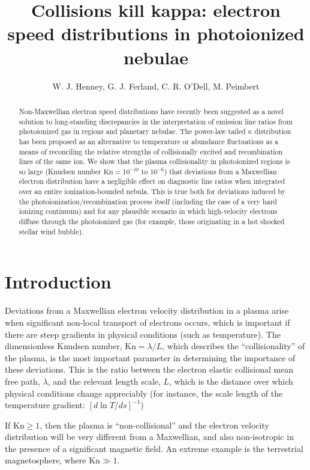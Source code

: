 \documentclass{emulateapj}
\newcommand\Kn{\ensuremath{\mathrm{Kn}}}
\newcommand\hii{\ion{H}{2}}
\begin{document}
\title{Collisions kill kappa: electron speed distributions in
  photoionized nebulae}

\author{W. J. Henney, G. J. Ferland, C. R. O'Dell, M. Peimbert}

\begin{abstract}
  Non-Maxwellian electron speed distributions have recently been
  suggested as a novel solution to long-standing discrepancies in the
  interpretation of emission line ratios from photoionized gas in
  \hii{} regions and planetary nebulae.  The power-law tailed
  \(\kappa\)
  distribution has been proposed as an alternative to temperature or
  abundance fluctuations as a means of reconciling the relative
  strengths of collisionally excited and recombination lines of the
  same ion.  We show that the plasma collisionality in photoionized
  regions is so large (Knudsen number \(\Kn = 10^{-10}\)
  to \( 10^{-6}\))
  that deviations from a Maxwellian electron distribution have a
  negligible effect on diagnostic line ratios when integrated over an
  entire ionization-bounded nebula.  This is true both for deviations
  induced by the photoionization/recombination process itself
  (including the case of a very hard ionizing continuum) and for any
  plausible scenario in which high-velocity electrons diffuse through
  the photoionized gas (for example, those originating in a hot
  shocked stellar wind bubble). 
\end{abstract}

\section{Introduction}
\label{sec:introduction}

Deviations from a Maxwellian electron velocity distribution in a
plasma arise when significant non-local transport of electrons occurs,
which is important if there are steep gradients in physical conditions
(such as temperature).  The dimensionless Knudsen number,
\(\Kn = \lambda / L\),
which describes the ``collisionality'' of the plasma, is the most
important parameter in determining the importance of these deviations.
This is the ratio between the electron elastic collisional mean free
path, \(\lambda\),
and the relevant length scale, \(L\),
which is the distance over which physical conditions change
appreciably (for instance, the scale length of the temperature
gradient: \([d \ln T / d s]^{-1}\))

If \(\Kn \ge 1\), then the plasma is ``non-collisional'' and the
electron velocity distribution will be very different from a
Maxwellian, and also non-isotropic in the presence of a significant
magnetic field.  An extreme example is the terrestrial magnetosphere,
where \(\Kn \gg 1\).  
\end{document}
